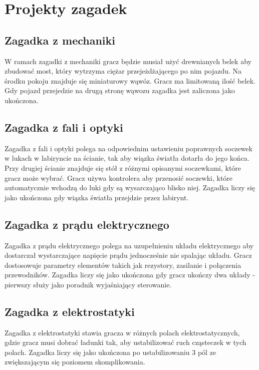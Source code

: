 \section{Projekty zagadek}

\subsection{Zagadka z mechaniki}
W ramach zagadki z mechaniki gracz będzie musiał użyć drewnianych belek aby zbudować most, który wytrzyma ciężar przejeżdżającego po nim pojazdu. Na środku pokoju znajduje się miniaturowy wąwóz. Gracz ma limitowaną ilość belek. Gdy pojazd przejedzie na drugą stronę wąwozu zagadka jest zaliczona jako ukończona.

\subsection{Zagadka z fali i optyki}
Zagadka z fali i optyki polega na odpowiednim ustawieniu poprawnych soczewek w lukach w labiryncie na ścianie, tak aby wiązka światła dotarła do jego końca. Przy drugiej ścianie znajduje się stół z różnymi opisanymi soczewkami, które gracz może wybrać. Gracz używa kontrolera aby przenosić soczewki, które automatycznie wchodzą do luki gdy są wysarczająco blisko niej. Zagadka liczy się jako ukończona gdy wiązka światła przejdzie przez labirynt.

\subsection{Zagadka z prądu elektrycznego}
Zagadka z prądu elektrycznego polega na uzupełnieniu układu elektrycznego aby dostarczał wystarczające napięcie prądu jednocześnie nie spalając układu. Gracz dostosowuje parametry elementów takich jak rezystory, zasilanie i połączenia przewodników. Zagadka liczy się jako ukończona gdy gracz ukończy dwa układy - pierwszy służy jako poradnik wyjaśniający sterowanie.

\subsection{Zagadka z elektrostatyki}
Zagadka z elektrostatyki stawia gracza w różnych polach elektrostatycznych, gdzie gracz musi dobrać ładunki tak, aby ustabilizować ruch cząsteczek w tych polach. Zagadka liczy się jako ukończona po ustabilizowaniu 3 pól ze zwiększającym się poziomem skomplikowania.
